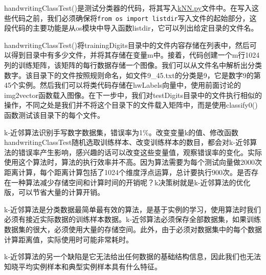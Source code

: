 handwritingClassTest()是测试分类器的代码，将其写入\href{https://github.com/JPL-JUNO/Machine-Learning-in-Action/blob/main/Codes/kNN.py}{kNN.py}文件中。在写入这些代码之前，我们必须确保将\verb|from os import listdir|写入文件的起始部分，这段代码的主要功能是从os模块中导入函数listdir，它可以列出给定目录的文件名。

handwritingClassTest()将trainingDigits目录中的文件内容存储在列表中，然后可以得到目录中有多少文件，并将其存储在变量m中。接着，代码创建一个m行1024列的训练矩阵，该矩阵的每行数据存储一个图像。我们可以从文件名中解析出分类数字。该目录下的文件按照规则命名，如文件9\_45.txt的分类是9，它是数字9的第45个实例。然后我们可以将类代码存储在hwLabels向量中，使用前面讨论的img2vector函数载入图像。在下一步中，我们对testDigits目录中的文件执行相似的操作，不同之处是我们并不将这个目录下的文件载入矩阵中，而是使用classify0()函数测试该目录下的每个文件。

k-近邻算法识别手写数字数据集，错误率为1\%。改变变量k的值、修改函数handwritingClassTest随机选取训练样本、改变训练样本的数目，都会对k-近邻算法的错误率产生影响，感兴趣的话可以改变这些变量值，观察错误率的变化。实际使用这个算法时，算法的执行效率并不高。因为算法需要为每个测试向量做2000次距离计算，每个距离计算包括了1024个维度浮点运算，总计要执行900次。是否存在一种算法减少存储空间和计算时间的开销呢？k决策树就是k-近邻算法的优化版，可以节省大量的计算开销。

k-近邻算法是分类数据最简单最有效的算法，是基于实例的学习，使用算法时我们必须有接近实际数据的训练样本数据。k-近邻算法必须保存全部数据集，如果训练数据集的很大，必须使用大量的存储空间。此外，由于必须对数据集中的每个数据计算距离值，实际使用时可能非常耗时。

k-近邻算法的另一个缺陷是它无法给出任何数据的基础结构信息，因此我们也无法知晓平均实例样本和典型实例样本具有什么特征。